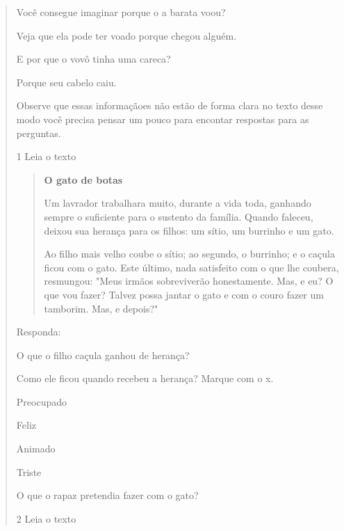 \begin{verse}
{Você consegue imaginar porque o a barata voou?

Veja que ela pode ter voado porque chegou alguém.

E por que o vovô tinha uma careca?

Porque seu cabelo caiu.

Observe que essas informaçãoes não estão de forma clara no texto desse
modo você precisa pensar um pouco para encontar respostas para as
perguntas.}


\num{1} Leia o texto

\begin{quote}
\textbf{O gato de botas}

Um lavrador trabalhara muito, durante a vida toda, ganhando sempre o
suficiente para o sustento da família. Quando faleceu, deixou sua
herança para os filhos: um sítio, um burrinho e um gato.

Ao filho mais velho coube o sítio; ao segundo, o
burrinho; e o caçula ficou com o gato.
Este último, nada satisfeito com o que lhe coubera,
resmungou: "Meus irmãos sobreviverão honestamente. Mas, e eu? O que vou
fazer? Talvez possa jantar o gato e com o couro fazer um tamborim. Mas,
e depois?"
\end{quote}


Responda:

\begin{escolha}
\item O que o filho caçula ganhou de herança?


\item Como ele ficou quando recebeu a herança? Marque com o x.

\begin{boxlist}
\boxitem[] Preocupado

\boxitem[] Feliz

\boxitem[] Animado

\boxitem[] Triste
\end{boxlist}

\item O que o rapaz pretendia fazer com o gato?

\end{escolha}

\num{2} Leia o texto


\end{verse}
